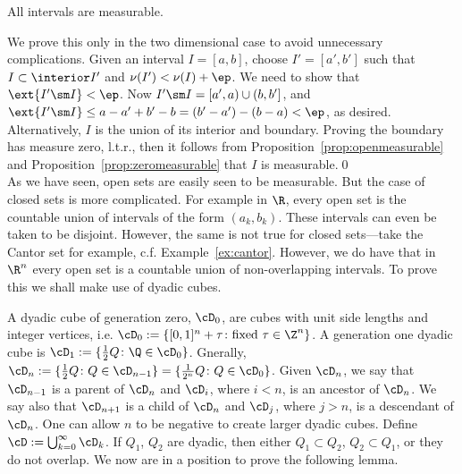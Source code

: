 

\begin{prop}
All intervals are measurable.
\end{prop}

\pfsk We prove this only in the two dimensional case to avoid unnecessary complications. Given an interval $I=[a,b]$, choose $I'=[a',b']$ such that $I \subset \interior I'$ and $\nu(I')< \nu(I)+\ep$. We need to show that $\ext{I' \sm I}<\ep$. Now $I' \sm I=[a',a) \cup (b,b']$, and $\ext{I' \sm I} \leq a-a'+b'-b= (b'-a') - (b-a)<\ep$, as desired. Alternatively, $I$ is the union of its interior and boundary. Proving the boundary has measure zero, l.t.r., then it follows from Proposition~\ref{prop:openmeasurable} and Proposition~\ref{prop:zeromeasurable} that $I$ is measurable.\qed \\


As we have seen, open sets are easily seen to be measurable. But the case of closed sets is more complicated. For example in $\R$, every open set is the countable union of intervals of the form $(a_k,b_k)$. These intervals can even be taken to be disjoint. However, the same is not true for closed sets---take the Cantor set for example, c.f. Example~\ref{ex:cantor}. However, we do have that in $\R^n$ every open set is a countable union of non-overlapping intervals. To prove this we shall make use of dyadic cubes.


A dyadic cube of generation zero, $\cD_0$, are cubes with unit side lengths and integer vertices, i.e. $\cD_0:=\{[0,1]^n + \tau \colon \text{fixed } \tau \in \Z^n\}$. A generation one dyadic cube is $\cD_1:= \{\frac{1}{2}Q \colon \Q \in \cD_0\}$. Gnerally, $\cD_n:= \{\frac{1}{2} Q \colon Q \in \cD_{n-1}\}=\{\frac{1}{2^n}Q \colon Q \in \cD_0\}$. Given $\cD_n$, we say that $\cD_{n-1}$ is a parent of $\cD_n$ and $\cD_i$, where $i<n$, is an ancestor of $\cD_n$. We say also that $\cD_{n+1}$ is a child of $\cD_n$ and $\cD_j$, where $j>n$, is a descendant of $\cD_n$. One can allow $n$ to be negative to create larger dyadic cubes. Define $\cD:= \bigcup_{k=0}^\infty \cD_k$. If $Q_1$, $Q_2$ are dyadic, then either $Q_1 \subset Q_2$, $Q_2 \subset Q_1$, or they do not overlap. We now are in a position to prove the following lemma. 


